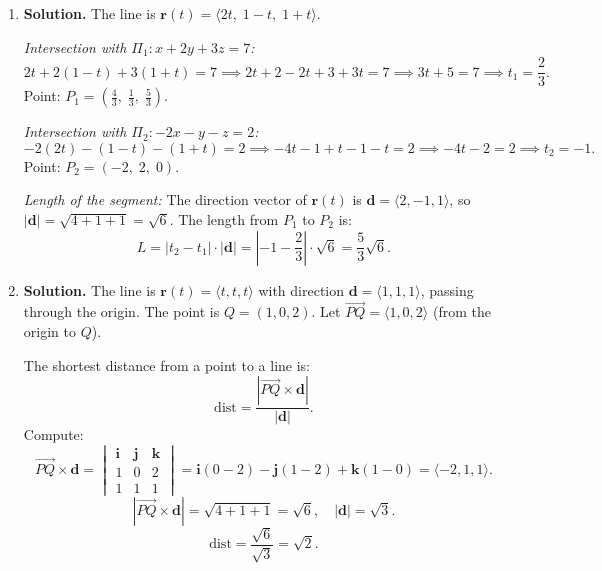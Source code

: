 \begin{enumerate}
\textit{Intersection check:} Set \( \mathbf{r}_1(t) = \mathbf{r}_2(s) \):
\[
t = 1 + s, \quad 2t = 2, \quad 3t = 3s.
\]
From the second equation, \( t = 1 \). From the first equation, \( s = t - 1 = 0 \). Check the third: \( 3(1) = 3(0) \) gives \( 3 = 0 \), a contradiction.

Since the lines are not parallel and do not intersect, they are \textbf{skew}.

\item \textbf{Solution.}
The line is \( \mathbf{r}(t) = \langle 2t,\; 1 - t,\; 1 + t \rangle \).

\textit{Intersection with \( \Pi_1: x + 2y + 3z = 7 \):}
\[
2t + 2(1 - t) + 3(1 + t) = 7 \implies 2t + 2 - 2t + 3 + 3t = 7 \implies 3t + 5 = 7 \implies t_1 = \frac{2}{3}.
\]
Point: \( P_1 = \left(\frac{4}{3},\; \frac{1}{3},\; \frac{5}{3}\right) \).

\textit{Intersection with \( \Pi_2: -2x - y - z = 2 \):}
\[
-2(2t) - (1 - t) - (1 + t) = 2 \implies -4t - 1 + t - 1 - t = 2 \implies -4t - 2 = 2 \implies t_2 = -1.
\]
Point: \( P_2 = (-2,\; 2,\; 0) \).

\textit{Length of the segment:} The direction vector of \( \mathbf{r}(t) \) is \( \mathbf{d} = \langle 2, -1, 1 \rangle \), so \( |\mathbf{d}| = \sqrt{4 + 1 + 1} = \sqrt{6} \). The length from \( P_1 \) to \( P_2 \) is:
\[
L = |t_2 - t_1| \cdot |\mathbf{d}| = \left|-1 - \frac{2}{3}\right| \cdot \sqrt{6} = \frac{5}{3}\sqrt{6}.
\]

\item \textbf{Solution.}
The line is \( \mathbf{r}(t) = \langle t, t, t \rangle \) with direction \( \mathbf{d} = \langle 1, 1, 1 \rangle \), passing through the origin. The point is \( Q = (1, 0, 2) \). Let \( \overrightarrow{PQ} = \langle 1, 0, 2 \rangle \) (from the origin to \( Q \)).

The shortest distance from a point to a line is:
\[
\text{dist} = \frac{|\overrightarrow{PQ} \times \mathbf{d}|}{|\mathbf{d}|}.
\]
Compute:
\[
\overrightarrow{PQ} \times \mathbf{d} = \begin{vmatrix} \mathbf{i} & \mathbf{j} & \mathbf{k} \\ 1 & 0 & 2 \\ 1 & 1 & 1 \end{vmatrix} = \mathbf{i}(0 - 2) - \mathbf{j}(1 - 2) + \mathbf{k}(1 - 0) = \langle -2, 1, 1 \rangle.
\]
\[
|\overrightarrow{PQ} \times \mathbf{d}| = \sqrt{4 + 1 + 1} = \sqrt{6}, \quad |\mathbf{d}| = \sqrt{3}.
\]
\[
\text{dist} = \frac{\sqrt{6}}{\sqrt{3}} = \sqrt{2}.
\]


\end{enumerate}
